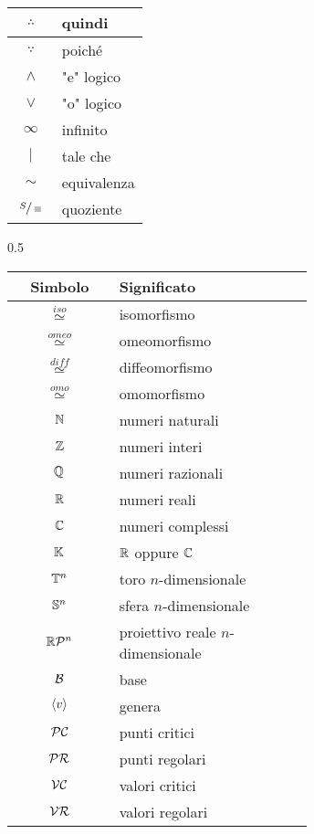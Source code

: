 \begin{table}[H]
{\begin{tabular}{|c|p{0.65\linewidth}|}
					\hline
					$ \therefore $ & quindi \\
					\hline
					$ \because $ & poiché \\
					\hline
					$ \land $ & "e" logico \\
					\hline
					$ \lor $ & "o" logico \\
					\hline
					$ \infty $ & infinito \\
					\hline
					$ \mid $ & tale che \\
					\hline
					$ \sim $ & equivalenza \\
					\hline
					$ \sfrac{S}{\equiv} $ & quoziente \\
					\hline
				\end{tabular}
				}
		{0.5}{%
				\begin{tabular}{|c|p{0.65\linewidth}|}
					\hline
					\textbf{Simbolo} & \textbf{Significato} \\
					\hline
					\hline
					$ \stackrel{iso}{\simeq} $ & isomorfismo \\
					\hline
					$ \stackrel{omeo}{\simeq} $ & omeomorfismo \\
					\hline
					$ \stackrel{diff}{\simeq} $ & diffeomorfismo \\
					\hline
					$ \stackrel{omo}{\simeq} $ & omomorfismo \\
					\hline
					$ \N $ & numeri naturali \\
					\hline
					$ \Z $ & numeri interi \\
					\hline
					$ \Q $ & numeri razionali \\
					\hline
					$ \R $ & numeri reali \\
					\hline
					$ \C $ & numeri complessi \\
					\hline
					$ \K $ & $ \R $ oppure $ \C $ \\
					\hline
					$ \T^{n} $ & toro $ n $-dimensionale \\
					\hline
					$ \S^{n} $ & sfera $ n $-dimensionale \\
					\hline
					$ \rp{n} $ & proiettivo reale $ n $-dimensionale \\
					\hline
					$ \B $ & base \\
					\hline
					$ \ev{v} $ & genera \\
					\hline
					$ \PC $ &  punti critici \\
					\hline
					$ \PR $ &  punti regolari \\
					\hline
					$ \VC $ & valori critici \\
					\hline
					$ \VR $ & valori regolari \\

\end{tabular}}
\end{table}
